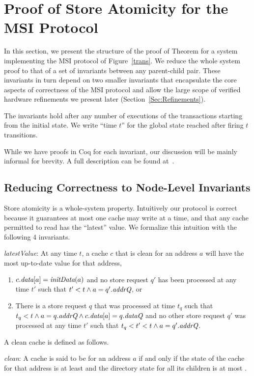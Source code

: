 \section{Proof of Store Atomicity for the MSI Protocol}
\label{Sec:Safety}

In this section, we present the structure of the proof of Theorem
 for a system implementing the MSI protocol of
Figure~\ref{trans}. We reduce the whole system proof to that of a set
of invariants between any parent-child pair. These invariants in turn
depend on two smaller invariants that encapsulate the core aspects of
correctness of the MSI protocol and allow the large scope of verified
hardware refinements we present later (Section~\ref{Sec:Refinements}).

The invariants hold after any number of executions of the transactions
starting from the initial state. We write ``time $t$'' for
the global state reached after firing $t$ transitions.

While we have proofs in Coq for each invariant, our discussion will be mainly
informal for brevity. A full description can be found at~.

\subsection{Reducing Correctness to Node-Level Invariants}

Store atomicity is a whole-system property. Intuitively our
protocol is correct because it guarantees at most one cache may
write at a time, and that any cache permitted to read has
the ``latest'' value. We formalize this intuition with the following 4
invariants.

\begin{inv}
\textit{latestValue}:
At any time $t$, a cache $c$ that is clean for an address $a$ will have the most
up-to-date value for that address, \ie{}
\begin{enumerate}
\item $c.\textit{data}[a] = \textit{initData}(a)$ and no store request $q'$ has been processed at
any time $t'$ such that $t' < t \wedge a = q'.\textit{addrQ}$, or
\item There is a store request $q$ that was processed at time $t_q$ such that
$t_q < t \wedge a = q.\textit{addrQ} \wedge c.\textit{data}[a] = q.\textit{dataQ}$ and no other store
request $q'$ was processed at any time $t'$ such that $t_q < t' < t \wedge a =
q'.\textit{addrQ}$.
\end{enumerate}
\label{latestValue}
\end{inv}
A clean cache is defined as follows.
\begin{defn}
\textit{clean}: A cache is said to be \clean{} for an address $a$ if and only if
the state of the cache for that address is at least \Sh{} and the directory 
state for all its children is at most \Sh.
\end{defn}


